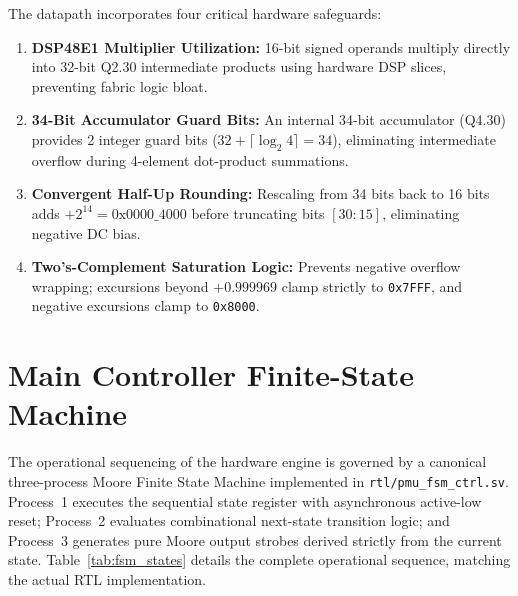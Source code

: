 \documentclass[11pt,a4paper]{report}
\begin{document}
The datapath incorporates four critical hardware safeguards:
\begin{enumerate}
    \item \textbf{DSP48E1 Multiplier Utilization:} 16-bit signed operands multiply directly
    into 32-bit Q2.30 intermediate products using hardware DSP slices, preventing fabric logic bloat.
    \item \textbf{34-Bit Accumulator Guard Bits:} An internal 34-bit accumulator (Q4.30) provides
    2 integer guard bits ($32 + \lceil \log_2 4 \rceil = 34$), eliminating intermediate overflow
    during 4-element dot-product summations.
    \item \textbf{Convergent Half-Up Rounding:} Rescaling from 34 bits back to 16 bits adds
    $+2^{14} = \text{0x0000\_4000}$ before truncating bits $[30:15]$, eliminating negative DC bias.
    \item \textbf{Two's-Complement Saturation Logic:} Prevents negative overflow wrapping;
    excursions beyond $+0.999969$ clamp strictly to \texttt{0x7FFF}, and negative excursions clamp to \texttt{0x8000}.
\end{enumerate}

\section{Main Controller Finite-State Machine}
The operational sequencing of the hardware engine is governed by a canonical three-process
Moore Finite State Machine implemented in \texttt{rtl/pmu\_fsm\_ctrl.sv}. Process~1 executes the
sequential state register with asynchronous active-low reset; Process~2 evaluates combinational
next-state transition logic; and Process~3 generates pure Moore output strobes derived
strictly from the current state. Table~\ref{tab:fsm_states} details the complete operational
sequence, matching the actual RTL implementation.
\end{document}
